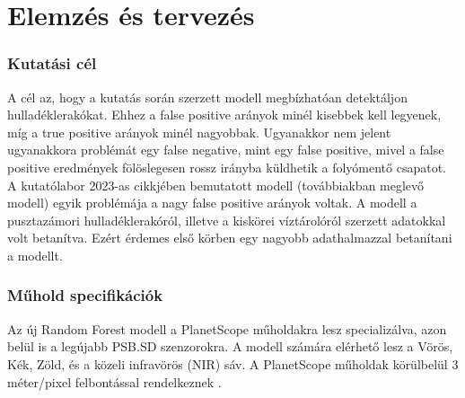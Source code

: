 \chapter{Elemzés és tervezés}
\label{ch:spec}

\subsection{Kutatási cél}

A cél az, hogy a kutatás során szerzett modell megbízhatóan detektáljon hulladéklerakókat. Ehhez a false positive arányok minél kisebbek kell legyenek, míg a true positive arányok minél nagyobbak. Ugyanakkor nem jelent ugyanakkora problémát egy false negative, mint egy false positive, mivel a false positive eredmények fölöslegesen rossz irányba küldhetik a folyómentő csapatot. 
A kutatólabor 2023-as cikkjében bemutatott modell (továbbiakban meglevő modell) egyik problémája a nagy false positive arányok voltak. A modell a pusztazámori hulladéklerakóról, illetve a kiskörei víztárolóról szerzett adatokkal volt betanítva. Ezért érdemes első körben egy nagyobb adathalmazzal betanítani a modellt.

\subsection{Műhold specifikációk}

Az új Random Forest modell a PlanetScope műholdakra lesz specializálva, azon belül is a legújabb PSB.SD szenzorokra\cite{planetsensors2024}. A modell számára elérhető lesz a Vörös, Kék, Zöld, és a közeli infravörös (NIR) sáv. A PlanetScope műholdak körülbelül 3 méter/pixel felbontással rendelkeznek \cite{planetresolution2024}.